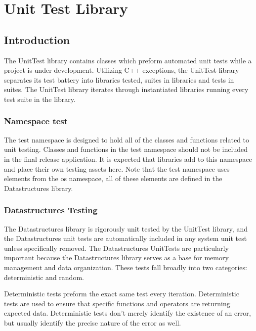 \part{Unit Test Library} \label{sec:unit-test}

\chapter{Introduction}

The UnitTest library contains classes which preform automated unit tests while a project is under development.  Utilizing C++ exceptions, the UnitTest library separates its test battery into libraries tested, suites in libraries and tests in suites.  The UnitTest library iterates through instantiated libraries running every test suite in the library.

	\section{Namespace test}
	
	The test namespace is designed to hold all of the classes and functions related to unit testing.  Classes and functions in the test namespace should not be included in the final release application.  It is expected that libraries add to this namespace and place their own testing assets here.  Note that the test namespace uses elements from the os namespace, all of these elements are defined in the Datastructures library.

	\section{Datastructures Testing} \label{subsec:datastructures-testing}
	
	The Datastructures library is rigorously unit tested by the UnitTest library, and the Datastructures unit tests are automatically included in any system unit test unless specifically removed.  The Datastructures UnitTests are particularly important because the Datastructures library serves as a base for memory management and data organization.  These tests fall broadly into two categories: deterministic and random.
	
	Deterministic tests preform the exact same test every iteration.  Deterministic tests are used to ensure that specific functions and operators are returning expected data.  Deterministic tests don't merely identify the existence of an error, but usually identify the precise nature of the error as well.
	
